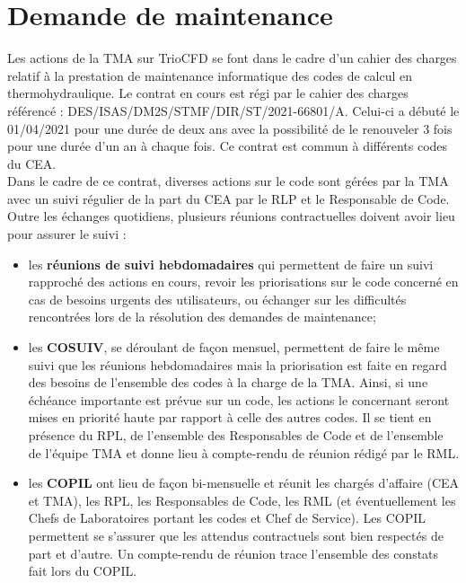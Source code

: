 \chapter{Demande de maintenance}
Les actions de la TMA sur TrioCFD se font dans le cadre d'un cahier des charges relatif à la prestation de maintenance informatique des codes de calcul en thermohydraulique. Le contrat en cours est régi par le cahier des charges référencé : DES/ISAS/DM2S/STMF/DIR/ST/2021-66801/A. Celui-ci a débuté le 01/04/2021 pour une durée de deux ans avec la possibilité de le renouveler 3 fois pour une durée d'un an à chaque fois. Ce contrat est commun à différents codes du CEA.\\
Dans le cadre de ce contrat, diverses actions sur le code sont gérées par la TMA avec un suivi régulier de la part du CEA par le RLP et le Responsable de Code. Outre les échanges quotidiens, plusieurs réunions contractuelles doivent avoir lieu pour assurer le suivi :\\ 
\begin{itemize}[label=$\Rightarrow$, font=\LARGE]
   \item les \textbf{réunions de suivi hebdomadaires} qui permettent de faire un suivi rapproché des actions en cours, revoir les priorisations sur le code concerné en cas de besoins urgents des utilisateurs, ou échanger sur les difficultés rencontrées lors de la résolution des demandes de maintenance;
   \item les \textbf{COSUIV}, se déroulant de façon mensuel, permettent de faire le même suivi que les réunions hebdomadaires mais la priorisation est faite en regard des besoins de l'ensemble des codes à la charge de la TMA. Ainsi, si une échéance importante est prévue sur un code, les actions le concernant seront mises en priorité haute par rapport à celle des autres codes. Il se tient en présence du RPL, de l'ensemble des Responsables de Code et de l'ensemble de l'équipe TMA et donne lieu à compte-rendu de réunion rédigé par le RML.
   \item les \textbf{COPIL} ont lieu de fa\c con bi-mensuelle et réunit les chargés d'affaire (CEA et TMA), les RPL, les Responsables de Code, les RML (et éventuellement les Chefs de Laboratoires portant les codes et Chef de Service). Les COPIL permettent se s'assurer que les attendus contractuels sont bien respectés de part et d'autre. Un compte-rendu de réunion trace l'ensemble des constats fait lors du COPIL.
\end{itemize}

